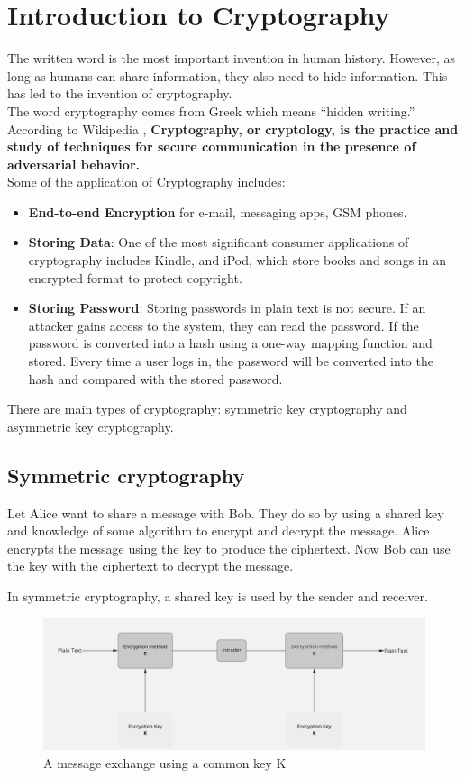 \documentclass[a4paper,12pt]{report}
\begin{document}
\section{Introduction to Cryptography}
The written word is the most important invention in human history. However, as long as humans can share information, they also need to hide information. This has led to the invention of cryptography.\\
The word cryptography comes from Greek which means “hidden writing.” According to Wikipedia \cite{enwiki:1083919625}, \textbf{Cryptography, or cryptology, is the practice and study of techniques for secure communication in the presence of adversarial behavior.}
\\Some of the application of Cryptography includes:
\begin{itemize}
	\item \textbf{End-to-end Encryption} for e-mail, messaging apps, GSM phones.
	\item \textbf{Storing Data}: One of the most significant consumer applications of cryptography includes Kindle, and iPod, which store books and songs in an encrypted format to protect copyright.
	\item \textbf{Storing Password}: Storing passwords in plain text is not secure. If an attacker gains access to the system, they can read the password. If the password is converted into a hash using a one-way mapping function and stored. Every time a user logs in, the password will be converted into the hash and compared with the stored password.
\end{itemize}
There are main types of cryptography: symmetric key cryptography and asymmetric key cryptography.


\subsection{Symmetric cryptography}
Let Alice want to share a message with Bob. They do so by using a shared key and knowledge of some algorithm to encrypt and decrypt the message. Alice encrypts the message using the key to produce the ciphertext. Now Bob can use the key with the ciphertext to decrypt the message.

In symmetric cryptography, a shared key is used by the sender and receiver.
\vspace{2cm}

\begin{figure}[h!]
	\begin{center}
		\caption{A message exchange using a common key K}
		\includegraphics[scale=0.37]{sym}
	\end{center}
\end{figure}
\vspace{2cm}
\end{document}
